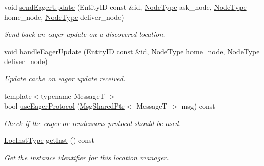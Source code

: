 \begin{DoxyCompactItemize}
void \hyperlink{structvt_1_1location_1_1_entity_location_coord_a9903f0c4581b9d8a231293e98cf9a11c}{send\+Eager\+Update} (Entity\+ID const \&id, \hyperlink{namespacevt_a866da9d0efc19c0a1ce79e9e492f47e2}{Node\+Type} ask\+\_\+node, \hyperlink{namespacevt_a866da9d0efc19c0a1ce79e9e492f47e2}{Node\+Type} home\+\_\+node, \hyperlink{namespacevt_a866da9d0efc19c0a1ce79e9e492f47e2}{Node\+Type} deliver\+\_\+node)
\begin{DoxyCompactList}\small\item\em Send back an eager update on a discovered location. \end{DoxyCompactList}\item 
void \hyperlink{structvt_1_1location_1_1_entity_location_coord_a02337c5b5c23bf81b540568107103ef4}{handle\+Eager\+Update} (Entity\+ID const \&id, \hyperlink{namespacevt_a866da9d0efc19c0a1ce79e9e492f47e2}{Node\+Type} home\+\_\+node, \hyperlink{namespacevt_a866da9d0efc19c0a1ce79e9e492f47e2}{Node\+Type} deliver\+\_\+node)
\begin{DoxyCompactList}\small\item\em Update cache on eager update received. \end{DoxyCompactList}\item 
{\footnotesize template$<$typename MessageT $>$ }\\bool \hyperlink{structvt_1_1location_1_1_entity_location_coord_a5d41b90c998e6de566868868c9cc4ba1}{use\+Eager\+Protocol} (\hyperlink{namespacevt_ab2b3d506ec8e8d1540aede826d84a239}{Msg\+Shared\+Ptr}$<$ MessageT $>$ msg) const
\begin{DoxyCompactList}\small\item\em Check if the eager or rendezvous protocol should be used. \end{DoxyCompactList}\item 
\hyperlink{namespacevt_1_1location_a4db6456e8024af2d23fc5ae560fef866}{Loc\+Inst\+Type} \hyperlink{structvt_1_1location_1_1_entity_location_coord_abff79ccad9dcd168217f99ee97048beb}{get\+Inst} () const
\begin{DoxyCompactList}\small\item\em Get the instance identifier for this location manager. \end{DoxyCompactList}\end{DoxyCompactItemize}
